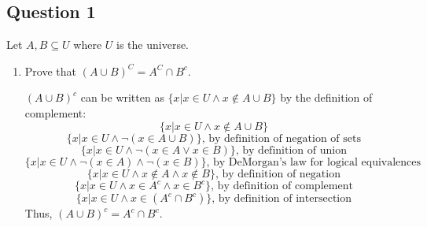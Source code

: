 \documentclass{article}
\begin{document}
\subsection*{Question 1}
Let $A, B \subseteq U$ where $U$ is the universe. 
\begin{enumerate}
    \item Prove that $(A \cup B)^C = A^C \cap B^c$.
        \begin{mdframed}
                        $(A \cup B)^c$ can be written as $\{x | x \in U \wedge x \notin A \cup B \}$ by the definition of complement:
                \begin{equation}
                    \{x | x \in U \wedge x \notin A \cup B\}
                \end{equation}
                \begin{equation}
                    \{x | x \in U \wedge \neg (x \in A \cup B)\}\text{, by definition of negation of sets}
                \end{equation}
                \begin{equation}
                    \{x | x \in U \wedge \neg (x \in A \vee x \in B)\}\text{, by definition of union}
                \end{equation}
                \begin{equation}
                    \{x | x \in U \wedge \neg (x \in A) \wedge \neg (x \in B)\}\text{, by DeMorgan's law for logical equivalences}
                \end{equation}
                \begin{equation}
                    \{x | x \in U \wedge x \notin A \wedge x \notin B\}\text{, by definition of negation}
                \end{equation}
                \begin{equation}
                    \{x | x \in U \wedge x \in A^c \wedge x \in B^c\}\text{, by definition of complement}
                \end{equation}
                \begin{equation}
                    \{x | x \in U \wedge x \in (A^c \cap B^c)\}\text{, by definition of intersection}
                \end{equation}
                Thus, $(A \cup B)^c=A^c \cap B^c$.
        \end{mdframed}


\end{enumerate}
\end{document}
